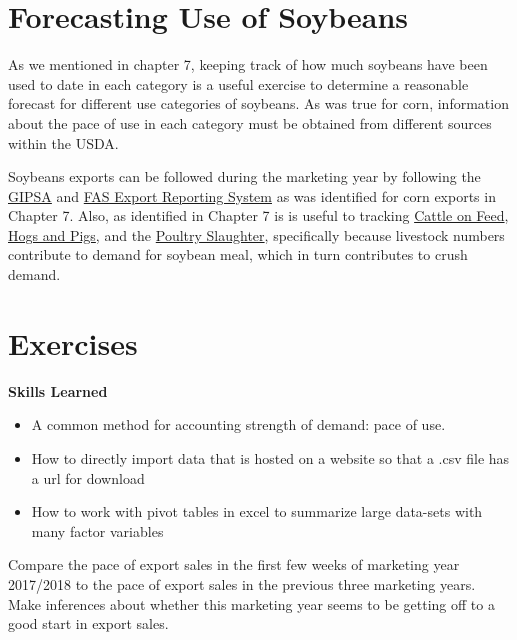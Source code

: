 \documentclass[
  letterpaper,
  DIV=11,
  numbers=noendperiod]{scrreprt}
\begin{document}
\hypertarget{forecasting-use-of-soybeans-1}{%
\section{Forecasting Use of
Soybeans}\label{forecasting-use-of-soybeans-1}}

As we mentioned in chapter 7, keeping track of how much soybeans have
been used to date in each category is a useful exercise to determine a
reasonable forecast for different use categories of soybeans. As was
true for corn, information about the pace of use in each category must
be obtained from different sources within the USDA.

Soybeans exports can be followed during the marketing year by following
the \href{}{GIPSA} and \href{}{FAS Export Reporting System} as was
identified for corn exports in Chapter 7. Also, as identified in Chapter
7 is is useful to tracking
\href{http://usda.mannlib.cornell.edu/MannUsda/viewDocumentInfo.do?documentID=1020}{Cattle
on Feed},
\href{http://usda.mannlib.cornell.edu/MannUsda/viewDocumentInfo.do?documentID=1086}{Hogs
and Pigs}, and the
\href{https://usda.mannlib.cornell.edu/MannUsda/viewDocumentInfo.do?documentID=1131}{Poultry
Slaughter}, specifically because livestock numbers contribute to demand
for soybean meal, which in turn contributes to crush demand.

\hypertarget{exercises-3}{%
\section{Exercises}\label{exercises-3}}

\textbf{Skills Learned}

\begin{itemize}
\item
  A common method for accounting strength of demand: pace of use.
\item
  How to directly import data that is hosted on a website so that a .csv
  file has a url for download
\item
  How to work with pivot tables in excel to summarize large data-sets
  with many factor variables
\end{itemize}

Compare the pace of export sales in the first few weeks of marketing
year 2017/2018 to the pace of export sales in the previous three
marketing years. Make inferences about whether this marketing year seems
to be getting off to a good start in export sales.
\end{document}
